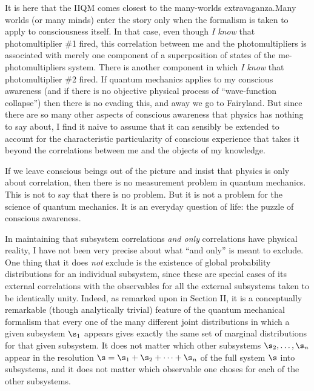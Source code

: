 It is here that the IIQM comes closest to the many-worlds
extravaganza.\fn Many worlds (or many minds) enter the story only when
the formalism is taken to apply to consciousness itself.  In that case,
even though {\it I know\/} that photomultiplier \#1 fired, this
correlation between me and the photomultipliers is associated with
merely one component of a superposition of states of the
me-photomultipliers system.  There is another component in which {\it
I know\/} that photomultiplier \#2 fired.  If quantum mechanics
applies to my conscious awareness (and if there is no objective
physical process of ``wave-function collapse'') then there is no
evading this, and away we go to Fairyland.  But since there are so
many other aspects of conscious awareness that physics has nothing to
say about, I find it naive to assume that it can sensibly be extended
to account for the characteristic particularity of conscious
experience that takes it beyond the correlations between me and the
objects of my knowledge.  

If we leave conscious beings out of the picture and insist that
physics is only about correlation, then there is no measurement
problem in quantum mechanics.  This is not to say that there is no
problem.  But it is not a problem for the science of quantum
mechanics.  It is an everyday question of life: the puzzle of
conscious awareness.

\bigskip
{}
\medskip 

In maintaining that subsystem correlations {\it and only} correlations
have physical reality, I have not been very precise about what ``and
only'' is meant to exclude.  One thing that it does {\it not\/}
exclude is the existence of global probability distributions for an
individual subsystem, since these are special cases of its external
correlations with the observables for all the external subsystems
taken to be identically unity.  Indeed, as remarked upon in Section
II, it is a conceptually remarkable (though analytically trivial)
feature of the quantum mechanical formalism that every one of the many
different joint distributions in which a given subsystem $\s_1$
appears gives exactly the same set of marginal distributions for that
given subsystem.  It does not matter which other subsystems
$\s_2,\ldots,\s_n$ appear in the resolution $\s =
\s_1 + \s_2 +\cdots+ \s_n$ of the full system $\s$ into subsystems,
and it does not matter which observable one choses for each of the
other subsystems.  

